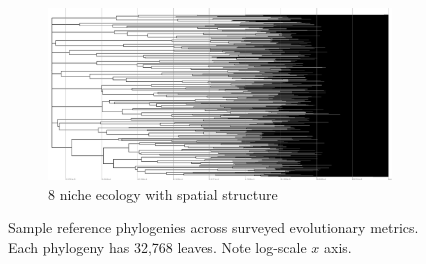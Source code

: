 \begin{figure}
\begin{subfigure}[b]{0.48\textwidth}
    \includegraphics[height=0.12\textheight,width=\textwidth]{img/perfect-tree-phylogenies-log/epoch=7+resolution=3+treatment=18.pdf}
    \caption{%
      8 niche ecology with spatial structure}
  \end{subfigure}
  \hfill
  \caption{%
    Sample reference phylogenies across surveyed evolutionary metrics.
    Each phylogeny has 32,768 leaves.
    Note log-scale $x$ axis.
  }
  \label{fig:perfect-tree-phylogenies-log}
\end{figure}



